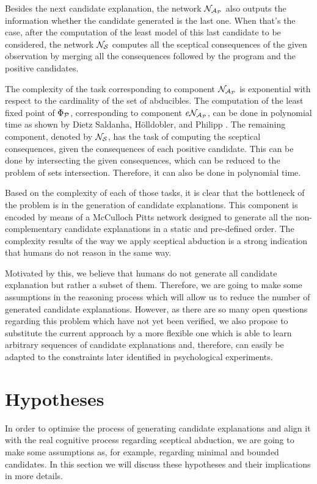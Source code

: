 Besides the next candidate explanation, the network $\mathcal{N}_{\mathcal{A}_{\mathcal{P}}}$ also outputs the information whether the candidate generated is the last one. When that's the case, after the computation of the least model of this last candidate to be considered, the network $\mathcal{N}_{\mathcal{S}}$ computes all the sceptical consequences of the given observation by merging all the consequences followed by the program and the positive candidates.

The complexity of the task corresponding to component $\mathcal{N}_{\mathcal{A}_{\mathcal{P}}}$ is exponential with respect to the cardinality of the set of abducibles. The computation of the least fixed point of $\Phi_{\mathcal{P}}$, corresponding to component $e\mathcal{N}_{\mathcal{A}_{\mathcal{P}}}$, can be done in polynomial time as shown by Dietz Saldanha, H{\"o}lldobler, and Philipp \cite{saldanha1872contextual}. The remaining component, denoted by $\mathcal{N}_{\mathcal{S}}$, has the task of computing the sceptical consequences, given the consequences of each positive candidate. This can be done by intersecting the given consequences, which can be reduced to the problem of sets intersection. Therefore, it can also be done in polynomial time.

Based on the complexity of each of those tasks, it is clear that the bottleneck of the problem is in the generation of candidate explanations. This component is encoded by means of a McCulloch Pitts network designed to generate all the non-complementary candidate explanations in a static and pre-defined order. The complexity results of the way we apply sceptical abduction is a strong indication that humans do not reason in the same way. 

Motivated by this, we believe that humans do not generate all candidate explanation but rather a subset of them. Therefore, we are going to make some assumptions in the reasoning process which will allow us to reduce the number of generated candidate explanations. However, as there are so many open questions regarding this problem which have not yet been verified, we also propose to substitute the current approach by a more flexible one which is able to learn arbitrary sequences of candidate explanations and, therefore, can easily be adapted to the constraints later identified in psychological experiments.

\section{Hypotheses}

In order to optimise the process of generating candidate explanations and align it with the real cognitive process regarding sceptical abduction, we are going to make some assumptions as, for example, regarding minimal and bounded candidates. In this section we will discuss these hypotheses and their implications in more details.

